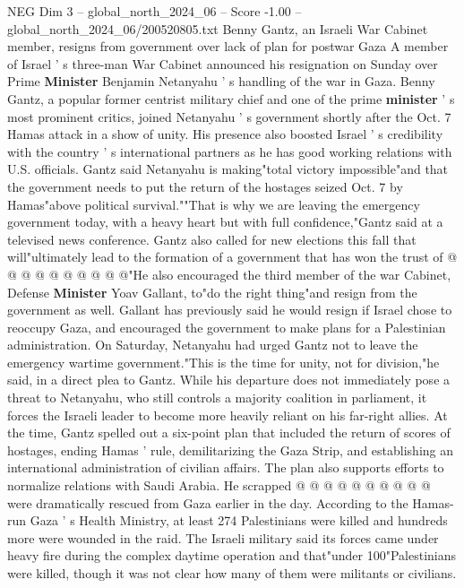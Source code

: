 \begin{textsample}{NEG Dim 3 – global\_north\_2024\_06 – Score -1.00 – global\_north\_2024\_06/200520805.txt}  \label{ex:f3_neg_395}
Benny Gantz, an Israeli War Cabinet member, resigns from government over lack of plan for postwar Gaza A member of Israel ' s three-man War Cabinet announced his resignation on Sunday over Prime \textbf{Minister} Benjamin Netanyahu ' s handling of the war in Gaza.
Benny Gantz, a popular former centrist military chief and one of the prime \textbf{minister} ' s most prominent critics, joined Netanyahu ' s government shortly after the Oct. 7 Hamas attack in a show of unity.
His presence also boosted Israel ' s credibility with the country ' s international partners as he has good working relations with U.S. officials.
Gantz said Netanyahu is making"total victory impossible"and that the government needs to put the return of the hostages seized Oct. 7 by Hamas"above political survival.""That is why we are leaving the emergency government today, with a heavy heart but with full confidence,"Gantz said at a televised news conference.
Gantz also called for new elections this fall that will"ultimately lead to the formation of a government that has won the trust of @ @ @ @ @ @ @ @ @ @"He also encouraged the third member of the war Cabinet, Defense \textbf{Minister} Yoav Gallant, to"do the right thing"and resign from the government as well.
Gallant has previously said he would resign if Israel chose to reoccupy Gaza, and encouraged the government to make plans for a Palestinian administration.
On Saturday, Netanyahu had urged Gantz not to leave the emergency wartime government."This is the time for unity, not for division,"he said, in a direct plea to Gantz.
While his departure does not immediately pose a threat to Netanyahu, who still controls a majority coalition in parliament, it forces the Israeli leader to become more heavily reliant on his far-right allies.
At the time, Gantz spelled out a six-point plan that included the return of scores of hostages, ending Hamas ' rule, demilitarizing the Gaza Strip, and establishing an international administration of civilian affairs.
The plan also supports efforts to normalize relations with Saudi Arabia.
He scrapped @ @ @ @ @ @ @ @ @ @ were dramatically rescued from Gaza earlier in the day.
According to the Hamas-run Gaza ' s Health Ministry, at least 274 Palestinians were killed and hundreds more were wounded in the raid.
The Israeli military said its forces came under heavy fire during the complex daytime operation and that"under 100"Palestinians were killed, though it was not clear how many of them were militants or civilians.

\end{textsample}
